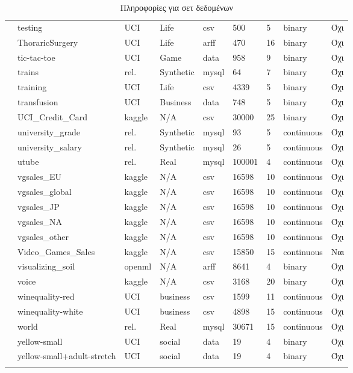 {\begin{longtable}{|l| l| l | l | l | l |l | l | l | }
 				\rownumber & testing \citep{wilt} & UCI & Life & csv & 500 & 5 & binary & Όχι \\
 				\rownumber & ThoraricSurgery  \citep{thoraric}& UCI & Life & arff & 470 & 16 & binary & Όχι  \\
 				\rownumber & tic-tac-toe \citep{tic} & UCI & Game & data & 958 & 9 &  binary & Όχι \\
 				\rownumber & trains \citep{Trains} & rel. & Synthetic & mysql & 64 & 7 & binary & Όχι \\
 				\rownumber & training \citep{wilt} & UCI & Life  & csv & 4339 & 5 & binary & Όχι \\
 				\rownumber & transfusion & UCI & Business & data & 748 & 5 & binary& Όχι \\
 				\rownumber & UCI\_Credit\_Card & kaggle & N/A & csv & 30000 & 25 & binary & Όχι \\
 				\rownumber & university\_grade \citep{uni} & rel. & Synthetic & mysql & 93 & 5  & continuous & Όχι \\
 				\rownumber & university\_salary \citep{uni} & rel. & Synthetic & mysql & 26 & 5 & continuous & Όχι \\
 				\rownumber & utube \citep{utube} & rel. & Real & mysql & 100001 & 4 & continuous & Όχι \\
 					\rownumber & vgsales\_EU \citep{vgsales} & kaggle & N/A & csv  & 16598 & 10 & continuous & Όχι\\
 					\rownumber & vgsales\_global \citep{vgsales} & kaggle & N/A & csv  & 16598 & 10 & continuous & Όχι \\
 					\rownumber & vgsales\_JP \citep{vgsales} & kaggle & N/A & csv  & 16598 & 10 & continuous & Όχι \\
 					\rownumber & vgsales\_NA \citep{vgsales} & kaggle & N/A & csv  & 16598 & 10 & continuous & Όχι \\
 					\rownumber & vgsales\_other \citep{vgsales} & kaggle & N/A & csv  & 16598 & 10 & continuous & Όχι \\
 					\rownumber & Video\_Games\_Sales \citep{vgames} & kaggle & N/A & csv & 15850 & 15 & continuous & Ναι \\
 					\rownumber & visualizing\_soil \citep{soil} & openml & N/A & arff & 8641 & 4 & binary & Όχι \\
 					\rownumber & voice \citep{voice} & kaggle & N/A & csv & 3168 & 20 & binary & Όχι \\
 					\rownumber & winequality-red & UCI & business & csv & 1599 & 11 & continuous & Όχι \\
 					\rownumber & winequality-white & UCI & business & csv & 4898 & 15 & continuous & Όχι \\
 					\rownumber & world & rel. & Real & mysql & 30671 & 15 & continuous & Όχι \\
 					\rownumber & yellow-small \citep{balloons}  & UCI & social & data  & 19 & 4 & binary & Όχι\\
 					\rownumber & yellow-small+adult-stretch \citep{balloons}  & UCI & social & data  & 19& 4 & binary & Όχι\\
			\hline   
			\caption{Πληροφορίες για σετ δεδομένων}\label{mfs} 
 \end{longtable}
}
